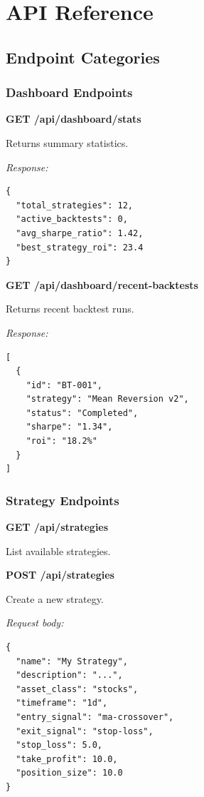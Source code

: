 \documentclass[11pt,a4paper]{article}
\begin{document}
\section{API Reference}

\subsection{Endpoint Categories}

\subsubsection{Dashboard Endpoints}

\textbf{GET /api/dashboard/stats}

Returns summary statistics.

\textit{Response:}
\begin{lstlisting}[style=jsoncode]
{
  "total_strategies": 12,
  "active_backtests": 0,
  "avg_sharpe_ratio": 1.42,
  "best_strategy_roi": 23.4
}
\end{lstlisting}

\textbf{GET /api/dashboard/recent-backtests}

Returns recent backtest runs.

\textit{Response:}
\begin{lstlisting}[style=jsoncode]
[
  {
    "id": "BT-001",
    "strategy": "Mean Reversion v2",
    "status": "Completed",
    "sharpe": "1.34",
    "roi": "18.2%"
  }
]
\end{lstlisting}

\subsubsection{Strategy Endpoints}

\textbf{GET /api/strategies}

List available strategies.

\textbf{POST /api/strategies}

Create a new strategy.

\textit{Request body:}
\begin{lstlisting}[style=jsoncode]
{
  "name": "My Strategy",
  "description": "...",
  "asset_class": "stocks",
  "timeframe": "1d",
  "entry_signal": "ma-crossover",
  "exit_signal": "stop-loss",
  "stop_loss": 5.0,
  "take_profit": 10.0,
  "position_size": 10.0
}
\end{lstlisting}
\end{document}
